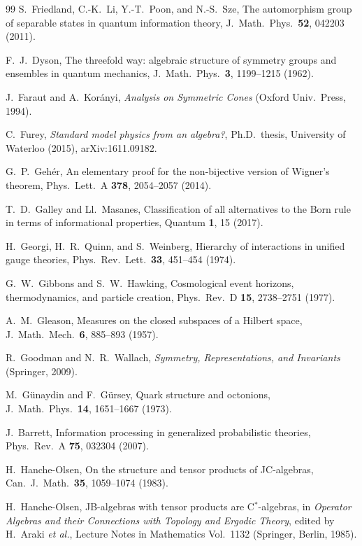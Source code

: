 \documentclass[aps,pra,onecolumn,superscriptaddress,nofootinbib,10pt]{revtex4-2}
\theoremstyle{definition}
\theoremstyle{remark}
\begin{document}
\begin{thebibliography}{99}
 S.~Friedland, C.-K.~Li, Y.-T.~Poon, and N.-S.~Sze, The automorphism group of separable states in quantum information theory, J.\ Math.\ Phys.\ \textbf{52}, 042203 (2011).

 F.~J.~Dyson, The threefold way: algebraic structure of symmetry groups and ensembles in quantum mechanics, J.\ Math.\ Phys.\ \textbf{3}, 1199--1215 (1962).

 J.~Faraut and A.~Kor\'anyi, \emph{Analysis on Symmetric Cones} (Oxford Univ.\ Press, 1994).

 C.~Furey, \emph{Standard model physics from an algebra?}, Ph.D.\ thesis, University of Waterloo (2015), arXiv:1611.09182.

 G.~P.~Geh\'er, An elementary proof for the non-bijective version of Wigner's theorem, Phys.\ Lett.\ A \textbf{378}, 2054--2057 (2014).

 T.~D.~Galley and Ll.~Masanes, Classification of all alternatives to the Born rule in terms of informational properties, Quantum \textbf{1}, 15 (2017).

 H.~Georgi, H.~R.~Quinn, and S.~Weinberg, Hierarchy of interactions in unified gauge theories, Phys.\ Rev.\ Lett.\ \textbf{33}, 451--454 (1974).

 G.~W.~Gibbons and S.~W.~Hawking, Cosmological event horizons, thermodynamics, and particle creation, Phys.\ Rev.\ D \textbf{15}, 2738--2751 (1977).

 A.~M.~Gleason, Measures on the closed subspaces of a Hilbert space, J.\ Math.\ Mech.\ \textbf{6}, 885--893 (1957).

 R.~Goodman and N.~R.~Wallach, \emph{Symmetry, Representations, and Invariants} (Springer, 2009).

 M.~G\"unaydin and F.~G\"ursey, Quark structure and octonions, J.\ Math.\ Phys.\ \textbf{14}, 1651--1667 (1973).

 J.~Barrett, Information processing in generalized probabilistic theories, Phys.\ Rev.\ A \textbf{75}, 032304 (2007).

 H.~Hanche-Olsen, On the structure and tensor products of JC-algebras, Can.\ J.\ Math.\ \textbf{35}, 1059--1074 (1983).

 H.~Hanche-Olsen, JB-algebras with tensor products are C$^*$-algebras, in \emph{Operator Algebras and their Connections with Topology and Ergodic Theory}, edited by H.~Araki \emph{et al.}, Lecture Notes in Mathematics Vol.~1132 (Springer, Berlin, 1985).


\end{thebibliography}
\end{document}
